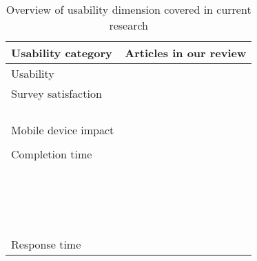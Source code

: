 \begin{table}
    \centering
	\begin{tabular}{ll}
		\toprule
		Usability category & Articles in our review\\
		\midrule
		Usability & \cite{mavletova_grid_2018, huff_comparison_2015}\\
        Survey satisfaction & \cite{de_bruijne_comparing_2013}\\
    	& \cite{mavletova_grid_2018}\\
    	& \cite{mavletova_sensitive_2013}\\
    	& \cite{lugtig_use_2016}\\
    	& \cite{toepoel_what_2014}\\
        Mobile device impact & \cite{schlosser_mobile_2018}\\
    	& \cite{mavletova_mobile_2014}\\
        Completion time & \cite{revilla_are_2017, ha_are_2019}\\
    	& \cite{revilla_are_2017, de_bruijne_comparing_2013}\\
    	& \cite{weigold_computerized_2021, ha_data_2020}\\
    	& \cite{mavletova_data_2013, hartman_does_2019}\\
    	& \cite{liebe_does_2015, antoun_effects_2017}\\
    	& \cite{lee_experimental_2019, gummer_explaining_2015}\\
    	& \cite{antoun_factors_2020, mavletova_grid_2018}\\
    	& \cite{lambert_living_2015}\\
    	& \cite{buskirk_making_2014}\\
    	& \cite{schlosser_mobile_2018, zou_mobile_2021}\\
    	& \cite{daikeler_motivated_2020, revilla_open_2016}\\
    	& \cite{skeie_smartphone_2019, revilla_testing_2018}\\
    	& \cite{huff_comparison_2015, mason_effect_2019}\\
    	& \cite{struminskaya_effects_2015}\\
    	& \cite{lugtig_use_2016}\\
    	& \cite{tourangeau_web_2018, keusch_web_2017}\\
    	& \cite{toepoel_what_2014}\\
    	& \cite{couper_why_2017}\\
    	Response time & \cite{liebe_does_2015, schlosser_mobile_2018}\\
        \bottomrule
    \end{tabular}
	\caption{Overview of usability dimension covered in current research}
	\label{tab: usability}
\end{table}


